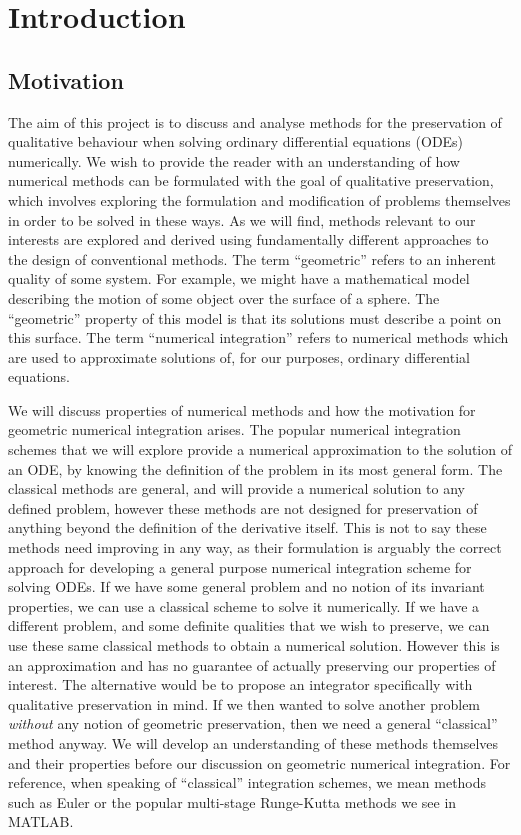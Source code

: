 

\chapter{Introduction}

\section{Motivation}

The aim of this project is to discuss and analyse methods for the preservation of qualitative behaviour when solving ordinary differential equations (ODEs)  numerically.
We wish to provide the reader with an understanding of how numerical methods can be formulated with the goal of qualitative preservation,
which involves exploring the formulation and modification of problems themselves in order to be solved in these ways.
As we will find, methods relevant to our interests are explored and derived using fundamentally different approaches to the design of conventional methods.
The term ``geometric'' refers to an inherent quality of some system.
For example, we might have a mathematical model describing the motion of some object over the surface of a sphere.
The ``geometric'' property of this model is that its solutions must describe a point on this surface.
The term ``numerical integration'' refers to numerical methods which are used to approximate solutions of, for our purposes, ordinary differential equations.

We will discuss properties of numerical methods and how the motivation for geometric numerical integration arises.
The popular numerical integration schemes that we will explore provide a numerical approximation to the solution of an ODE,
by knowing the definition of the problem in its most general form.
The classical methods are general, and will provide a numerical solution to any defined problem, however these methods are not designed for preservation of anything beyond the definition of the derivative itself.
This is not to say these methods need improving in any way, as their formulation is arguably the correct approach for developing a general purpose numerical integration scheme for solving ODEs.
If we have some general problem and no notion of its invariant properties, we can use a classical scheme to solve it numerically.
If we have a different problem, and some definite qualities that we wish to preserve, we can use these same classical methods to obtain a numerical solution.
However this is an approximation and has no guarantee of actually preserving our properties of interest.
The alternative would be to propose an integrator specifically with qualitative preservation in mind.
If we then wanted to solve another problem \textit{without} any notion of geometric preservation, then we need a general ``classical'' method anyway.
We will develop an understanding of these methods themselves and their properties before our discussion on geometric numerical integration.
For reference, when speaking of ``classical'' integration schemes, we mean methods such as Euler or the popular multi-stage Runge-Kutta methods we see in MATLAB.

